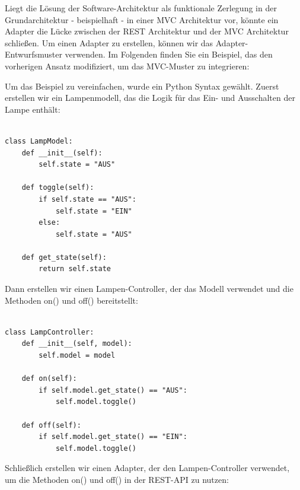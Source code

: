 \documentclass[../vs-script-first-v01.tex]{subfiles}
\begin{document}
Liegt die Lösung der Software-Architektur als funktionale Zerlegung in der Grundarchitektur - beispielhaft - in einer MVC Architektur vor, könnte ein Adapter die Lücke zwischen der REST Architektur und der MVC Architektur schließen. Um einen Adapter zu erstellen, können wir das Adapter-Entwurfsmuster verwenden. Im Folgenden finden Sie ein Beispiel, das den vorherigen Ansatz modifiziert, um das MVC-Muster zu integrieren:


Um das Beispiel zu vereinfachen, wurde ein Python Syntax gewählt. Zuerst erstellen wir ein Lampenmodell, das die Logik für das Ein- und Ausschalten der Lampe enthält:\\\\
\noindent\begin{minipage}{\textwidth}
\begin{lstlisting}[caption={LampModel},captionpos=b,label={lst:lamp_m}]
class LampModel:
    def __init__(self):
        self.state = "AUS"

    def toggle(self):
        if self.state == "AUS":
            self.state = "EIN"
        else:
            self.state = "AUS"

    def get_state(self):
        return self.state

\end{lstlisting}
\end{minipage}
Dann erstellen wir einen Lampen-Controller, der das Modell verwendet und die Methoden on() und off() bereitstellt:\\\\
\noindent\begin{minipage}{\textwidth}
\begin{lstlisting}[caption={LampController},captionpos=b,label={lst:lamp_c}]
class LampController:
    def __init__(self, model):
        self.model = model

    def on(self):
        if self.model.get_state() == "AUS":
            self.model.toggle()

    def off(self):
        if self.model.get_state() == "EIN":
            self.model.toggle()
\end{lstlisting}
\end{minipage}
Schließlich erstellen wir einen Adapter, der den Lampen-Controller verwendet, um die Methoden on() und off() in der REST-API zu nutzen:\\\\
\end{document}
